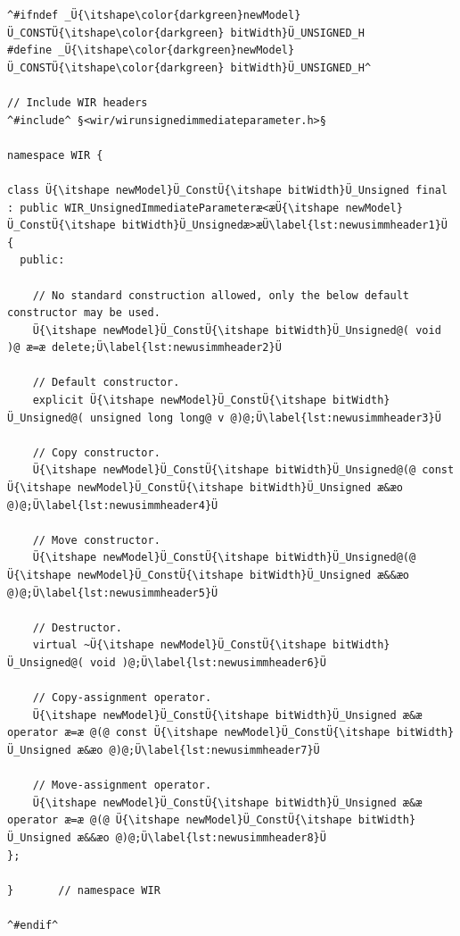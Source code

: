 \begin{enumerate}[resume]
\begin{lstlisting}[style=code,float=!t,caption={Header File for a New Unsigned Immediate Parameter's Class},label=lst:newusimmheader]
^#ifndef _Ü{\itshape\color{darkgreen}newModel}Ü_CONSTÜ{\itshape\color{darkgreen} bitWidth}Ü_UNSIGNED_H
#define _Ü{\itshape\color{darkgreen}newModel}Ü_CONSTÜ{\itshape\color{darkgreen} bitWidth}Ü_UNSIGNED_H^

// Include WIR headers
^#include^ §<wir/wirunsignedimmediateparameter.h>§

namespace WIR {

class Ü{\itshape newModel}Ü_ConstÜ{\itshape bitWidth}Ü_Unsigned final : public WIR_UnsignedImmediateParameteræ<æÜ{\itshape newModel}Ü_ConstÜ{\itshape bitWidth}Ü_Unsignedæ>æÜ\label{lst:newusimmheader1}Ü
{
  public:

    // No standard construction allowed, only the below default constructor may be used.
    Ü{\itshape newModel}Ü_ConstÜ{\itshape bitWidth}Ü_Unsigned@( void )@ æ=æ delete;Ü\label{lst:newusimmheader2}Ü

    // Default constructor.
    explicit Ü{\itshape newModel}Ü_ConstÜ{\itshape bitWidth}Ü_Unsigned@( unsigned long long@ v @)@;Ü\label{lst:newusimmheader3}Ü

    // Copy constructor.
    Ü{\itshape newModel}Ü_ConstÜ{\itshape bitWidth}Ü_Unsigned@(@ const Ü{\itshape newModel}Ü_ConstÜ{\itshape bitWidth}Ü_Unsigned æ&æo @)@;Ü\label{lst:newusimmheader4}Ü

    // Move constructor.
    Ü{\itshape newModel}Ü_ConstÜ{\itshape bitWidth}Ü_Unsigned@(@ Ü{\itshape newModel}Ü_ConstÜ{\itshape bitWidth}Ü_Unsigned æ&&æo @)@;Ü\label{lst:newusimmheader5}Ü

    // Destructor.
    virtual ~Ü{\itshape newModel}Ü_ConstÜ{\itshape bitWidth}Ü_Unsigned@( void )@;Ü\label{lst:newusimmheader6}Ü

    // Copy-assignment operator.
    Ü{\itshape newModel}Ü_ConstÜ{\itshape bitWidth}Ü_Unsigned æ&æ operator æ=æ @(@ const Ü{\itshape newModel}Ü_ConstÜ{\itshape bitWidth}Ü_Unsigned æ&æo @)@;Ü\label{lst:newusimmheader7}Ü

    // Move-assignment operator.
    Ü{\itshape newModel}Ü_ConstÜ{\itshape bitWidth}Ü_Unsigned æ&æ operator æ=æ @(@ Ü{\itshape newModel}Ü_ConstÜ{\itshape bitWidth}Ü_Unsigned æ&&æo @)@;Ü\label{lst:newusimmheader8}Ü
};

}       // namespace WIR

^#endif^
\end{lstlisting}


\end{enumerate}
